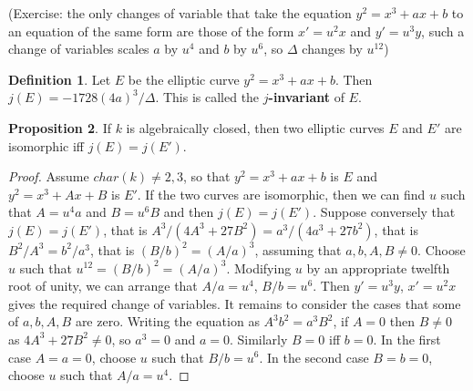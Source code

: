 \documentclass{article}
\newcommand{\rb}[1]{\left( #1 \right)}
\theoremstyle{definition}\newtheorem{definition}{Definition}[section]
\theoremstyle{definition}\newtheorem{remark}[definition]{Remark}
\theoremstyle{definition}\newtheorem*{example}{Example}
\theoremstyle{definition}\newtheorem*{note}{Note}
\newtheorem{proposition}[definition]{Proposition}
\begin{document}
(Exercise: the only changes of variable that take the equation $ y^2 = x^3 + ax + b $ to an equation of the same form are those of the form $ x' = u^2x $ and $ y' = u^3y $, such a change of variables scales $ a $ by $ u^4 $ and $ b $ by $ u^6 $, so $ \Delta $ changes by $ u^{12} $)

\begin{definition}
Let $ E $ be the elliptic curve $ y^2 = x^3 + ax + b $. Then $ j\rb{E} = -1728\rb{4a}^3 / \Delta $. This is called the \textbf{$ j $-invariant} of $ E $.
\end{definition}

\begin{proposition}
If $ k $ is algebraically closed, then two elliptic curves $ E $ and $ E' $ are isomorphic iff $ j\rb{E} = j\rb{E'} $.
\end{proposition}

\begin{proof}
Assume $ char\rb{k} \ne 2, 3 $, so that $ y^2 = x^3 + ax + b $ is $ E $ and $ y^2 = x^3 + Ax + B $ is $ E' $. If the two curves are isomorphic, then we can find $ u $ such that $ A = u^4a $ and $ B = u^6B $ and then $ j\rb{E} = j\rb{E'} $. Suppose conversely that $ j\rb{E} = j\rb{E'} $, that is $ A^3 / \rb{4A^3 + 27B^2} = a^3 / \rb{4a^3 + 27b^2} $, that is $ B^2 / A^3 = b^2 / a^3 $, that is $ \rb{B / b}^2 = \rb{A / a}^3 $, assuming that $ a, b, A, B \ne 0 $. Choose $ u $ such that $ u^{12} = \rb{B / b}^2 = \rb{A / a}^3 $. Modifying $ u $ by an appropriate twelfth root of unity, we can arrange that $ A / a = u^4 $, $ B / b = u^6 $. Then $ y' = u^3y $, $ x' = u^2x $ gives the required change of variables. It remains to consider the cases that some of $ a, b, A, B $ are zero. Writing the equation as $ A^3b^2 = a^3B^2 $, if $ A = 0 $ then $ B \ne 0 $ as $ 4A^3 + 27B^2 \ne 0 $, so $ a^3 = 0 $ and $ a = 0 $. Similarly $ B = 0 $ iff $ b = 0 $. In the first case $ A = a = 0 $, choose $ u $ such that $ B / b = u^6 $. In the second case $ B = b = 0 $, choose $ u $ such that $ A / a = u^4 $.
\end{proof}
\end{document}

